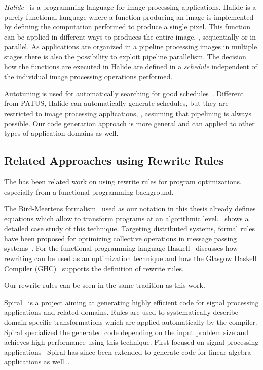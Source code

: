 \bigskip

\emph{Halide}~\cite{Ragan-KelleyAPLAD12,Ragan-KelleyBAPDA13} is a programming language for image processing applications.
Halide is a purely functional language where a function producing an image is implemented by defining the computation performed to produce a single pixel.
This function can be applied in different ways to produces the entire image, \eg, sequentially or in parallel.
As applications are organized in a pipeline processing images in multiple stages there is also the possibility to exploit pipeline parallelism.
The decision how the functions are executed in Halide are defined in a \emph{schedule} independent of the individual image processing operations performed.

Autotuning is used for automatically searching for good schedules~\cite{Ragan-KelleyBAPDA13}.
Different from PATUS, Halide can automatically generate schedules, but they are restricted to image processing applications, \eg, assuming that pipelining is always possible.
Our code generation approach is more general and can applied to other types of application domains as well.

\subsection{Related Approaches using Rewrite Rules}
The has been related work on using rewrite rules for program optimizations, especially from a functional programming background.

\bigskip

The Bird-Meertens formalism~\cite{Bird88} used as our notation in this thesis already defines equations which allow to transform programs at an algorithmic level.
\cite{Gorlatch96}~shows a detailed case study of this technique.
Targeting distributed systems, formal rules have been proposed for optimizing collective operations in message passing systems~\cite{GorlatchWL99,Gorlatch00,Gorlatch04}.
For the functional programming language Haskell \cite{JonesToHo2001}~discusses how rewriting can be used as an optimization technique and how the Glasgow Haskell Compiler (GHC)~\cite{HudakHJW07} supports the definition of rewrite rules.

Our rewrite rules can be seen in the same tradition as this work.

\bigskip

Spiral~\cite{PuschelMSXJPVJ04,OfenbeckRSOP13,SpampinatoP14} is a project aiming at generating highly efficient code for signal processing applications and related domains.
Rules are used to systematically describe domain specific transformations which are applied automatically by the compiler.
Spiral specialized the generated code depending on the input problem size and achieves high performance using this technique.
First focused on signal processing applications~\cite{PuschelMSXJPVJ04} Spiral has since been extended to generate code for linear algebra applications as well~\cite{SpampinatoP14}.

